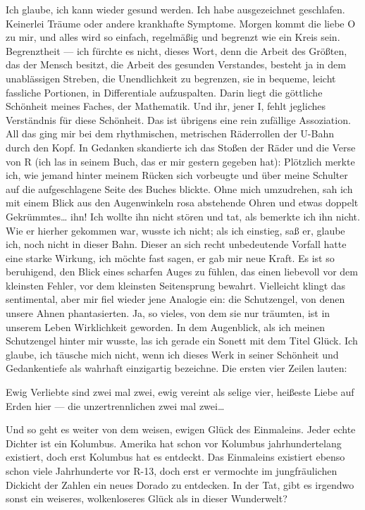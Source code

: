Ich glaube, ich kann wieder gesund werden. Ich habe ausgezeichnet
geschlafen. Keinerlei Träume oder andere krankhafte Symptome.
Morgen kommt die liebe O zu mir, und alles wird so einfach,
regelmäßig und begrenzt wie ein Kreis sein. Begrenztheit — ich
fürchte es nicht, dieses Wort, denn die Arbeit des Größten, das der
Mensch besitzt, die Arbeit des gesunden Verstandes, besteht ja in
dem unablässigen Streben, die Unendlichkeit zu begrenzen, sie in
bequeme, leicht fassliche Portionen, in Differentiale aufzuspalten.
Darin liegt die göttliche Schönheit meines Faches, der Mathematik.
Und ihr, jener I, fehlt jegliches Verständnis für diese Schönheit.
Das ist übrigens eine rein zufällige Assoziation. All das ging mir
bei dem rhythmischen, metrischen Räderrollen
der U-Bahn durch den Kopf. In Gedanken skandierte ich das
Stoßen der Räder und die Verse von R (ich las in seinem Buch, das
er mir gestern gegeben hat): Plötzlich merkte ich, wie jemand
hinter meinem Rücken sich vorbeugte und über meine Schulter auf die
aufgeschlagene Seite des Buches blickte. Ohne mich umzudrehen, sah
ich mit einem Blick aus den Augenwinkeln rosa abstehende Ohren und
etwas doppelt Gekrümmtes\ldots{} ihn! Ich wollte ihn nicht stören und
tat, als bemerkte ich ihn nicht. Wie er hierher gekommen war,
wusste ich nicht; als ich einstieg, saß er, glaube ich, noch nicht
in dieser Bahn. Dieser an sich recht unbedeutende Vorfall hatte
eine starke Wirkung, ich möchte fast sagen, er gab mir neue Kraft.
Es ist so beruhigend, den Blick eines scharfen Auges zu fühlen, das
einen liebevoll vor dem kleinsten Fehler, vor dem kleinsten
Seitensprung bewahrt. Vielleicht klingt das sentimental, aber mir
fiel wieder jene Analogie ein: die Schutzengel, von denen unsere
Ahnen phantasierten. Ja, so vieles, von dem sie nur träumten, ist
in unserem Leben Wirklichkeit geworden. In dem Augenblick, als ich
meinen Schutzengel hinter mir wusste, las ich gerade ein Sonett mit
dem Titel Glück. Ich glaube, ich täusche mich nicht, wenn ich
dieses Werk in seiner Schönheit und Gedankentiefe als wahrhaft
einzigartig bezeichne. Die ersten vier Zeilen lauten:

Ewig Verliebte sind zwei mal zwei, ewig vereint als selige vier,
heißeste Liebe auf Erden hier — die unzertrennlichen zwei mal
zwei\ldots{}

Und so geht es weiter von dem weisen, ewigen Glück des Einmaleins.
Jeder echte Dichter ist ein Kolumbus. Amerika hat schon vor
Kolumbus jahrhundertelang existiert, doch erst Kolumbus hat es
entdeckt. Das Einmaleins existiert ebenso schon viele Jahrhunderte
vor R-13, doch erst er vermochte im jungfräulichen Dickicht der
Zahlen ein neues Dorado zu entdecken. In der Tat, gibt es irgendwo
sonst ein weiseres, wolkenloseres Glück als in dieser Wunderwelt?

